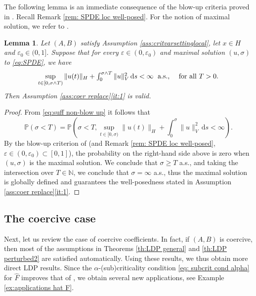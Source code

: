 \documentclass{amsart}
\newcommand{\dd}{\,\mathrm{d}}
\newcommand{\<}{\langle}
\newcommand{\?}{\rangle}
\theoremstyle{plain}
\theoremstyle{remark}
\theoremstyle{plain}
\newtheorem{lemma}[theorem]{Lemma}
\numberwithin{equation}{section}
\def\N{{\mathbb N}}
\renewcommand{\P}{\mathbb{P}}
\newcommand{\eps}{\varepsilon}
\begin{document}
The following lemma is an immediate consequence of the blow-up criteria proved in \cite{AV22variational,BGV}. Recall Remark \ref{rem: SPDE loc well-posed}. For the notion of maximal solution, we refer to \cite[Def.\ 4.4]{AV22nonlinear1}.  

\begin{lemma}\label{lem:suff non-blow up}
  Let $(A,B)$  satisfy  Assumption  \ref{ass:critvarsettinglocal}, let  $x\in H$ and $\eps_0\in(0,1]$. Suppose that for every $\eps\in(0,\eps_0)$ and maximal solution $(u,\sigma)$ to \eqref{eq:SPDE}, we have  
  \begin{equation}\label{eq:suff non-blow up}
     \sup_{t\in[0,\sigma\wedge T)}\|u(t)\|_H+\textstyle{\int_0^{\sigma\wedge T}\|u\|_V^2\dd s}<\infty \; {\text{ a.s., \quad for all $T>0$.}}
  \end{equation}
  Then  Assumption \ref{ass:coer replace}\ref{it:1} is valid. 
\end{lemma}
\begin{proof}
 From \eqref{eq:suff non-blow up} it follows that 
 \[
 \P(\sigma<T)=\P(\sigma<T, \sup_{t\in[0,\sigma)}\|u(t)\|_H+\textstyle{\int_0^{\sigma}\|u\|_V^2\dd s}<\infty).
 \] 
 By the blow-up criterion of \cite[Th.\ 6.4]{BGV} (and Remark \ref{rem: SPDE loc well-posed}, $\eps\in(0,\eps_0)\subset[0,1]$), the probability on the right-hand side above is zero when $(u,\sigma)$ is the maximal solution. We conclude that $\sigma \geq T$ a.s., and taking the intersection over $T\in\N$, we conclude that $\sigma=\infty$ a.s., thus the maximal solution is globally defined and guarantees the well-posedness stated in Assumption \ref{ass:coer replace}\ref{it:1}. 
\end{proof} 
  
\subsection{The coercive case}\label{ss:mainresultcoercive}

Next, let us review the case of coercive coefficients. In fact, if $(A,B)$ is coercive, then most of the assumptions in Theorems \ref{th:LDP general} and \ref{th:LDP perturbed2} are satisfied automatically. Using these results, we thus obtain more direct LDP results.  Since the $\alpha$-(sub)criticality condition \eqref{eq: subcrit cond alpha} for $\hat{F}$ improves that of \cite{TV24}, we obtain several new applications, see Example \ref{ex:applications hat F}. 
 
\end{document}
